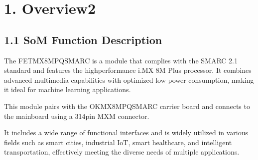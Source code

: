 \documentclass[letterpaper,10pt,openany,english]{sphinxmanual}
\begin{document}
\pagestyle{plain}
\sphinxtableofcontents
\pagestyle{normal}
\label{\detokenize{hardware::doc}}



\chapter{1. Overview2}
\label{\detokenize{hardware:overview2}}

\section{1.1 SoM Function Description}
\label{\detokenize{hardware:som-function-description}}
\sphinxAtStartPar
The FET\sphinxhyphen{}MX8MPQ\sphinxhyphen{}SMARC is a module that complies with the SMARC 2.1 standard and features the high\sphinxhyphen{}performance i.MX 8M Plus processor. It combines advanced multimedia capabilities with optimized low power consumption, making it ideal for machine learning applications.

\sphinxAtStartPar
This module pairs with the OK\sphinxhyphen{}MX8MPQ\sphinxhyphen{}SMARC carrier board and connects to the mainboard using a 314\sphinxhyphen{}pin MXM connector.

\sphinxAtStartPar
It includes a wide range of functional interfaces and is widely utilized in various fields such as smart cities, industrial IoT, smart healthcare, and intelligent transportation, effectively meeting the diverse needs of multiple applications.
\end{document}

